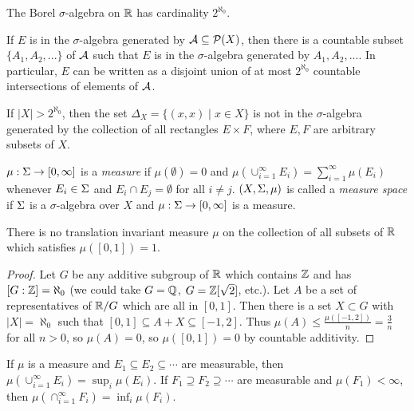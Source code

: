 \begin{cor} The Borel $\sigma$-algebra on $\mathbb{R}$ has cardinality $2^{\aleph_0}$.
\end{cor}

\begin{prop} If $E$ is in the $\sigma$-algebra generated by $\mathcal{A} \subseteq \mathcal{P}(X)$, then there is a countable subset $\{A_1, A_2, ...\}$ of $\mathcal{A}$ such that $E$ is in the $\sigma$-algebra generated by $A_1, A_2, ...$. In particular, $E$ can be written as a disjoint union of at most $2^{\aleph_0}$ countable intersections of elements of $\mathcal{A}$.
\end{prop}

\begin{cor}\label{nedoma} If $|X| > 2^{\aleph_0}$, then the set $\Delta_X = \{(x,x) \mid x \in X\}$ is not in the $\sigma$-algebra generated by the collection of all rectangles $E\times F$, where $E,F$ are arbitrary subsets of $X$.
\end{cor}

\begin{defn} $\mu:\Sigma \rightarrow [0,\infty]$ is a \emph{measure} if $\mu(\emptyset) = 0$ and $\mu(\cup_{i=1}^\infty E_i) = \sum_{i=1}^\infty \mu(E_i)$ whenever $E_i \in \Sigma$ and $E_i \cap E_j = \emptyset$ for all $i \ne j$. $(X,\Sigma, \mu)$ is called a \emph{measure space} if $\Sigma$ is a $\sigma$-algebra over $X$ and $\mu : \Sigma \rightarrow [0,\infty]$ is a measure.
\end{defn}

\begin{prop} There is no translation invariant measure $\mu$ on the collection of all subsets of $\mathbb{R}$ which satisfies $\mu([0,1]) = 1$.
\end{prop}
\begin{proof} Let $G$ be any additive subgroup of $\mathbb{R}$ which contains $\mathbb{Z}$ and has $[G:\mathbb{Z}] = \aleph_0$ (we could take $G = \mathbb{Q}$, $G = \mathbb{Z}[\sqrt{2}]$, etc.). Let $A$ be a set of representatives of $\mathbb{R}/G$ which are all in $[0,1]$. Then there is a set $X \subset G$ with $|X| = \aleph_0$ such that $[0,1] \subseteq A+X \subseteq [-1,2]$. Thus $\mu(A) \le \frac{\mu([-1,2])}{n} = \frac{3}{n}$ for all $n > 0$, so $\mu(A) = 0$, so $\mu([0,1]) = 0$ by countable additivity.
\end{proof}

\begin{prop} If $\mu$ is a measure and $E_1 \subseteq E_2 \subseteq \cdots$ are measurable, then $\mu(\cup_{i=1}^\infty E_i) = \sup_i \mu(E_i)$. If $F_1 \supseteq F_2 \supseteq \cdots$ are measurable and $\mu(F_1) < \infty$, then $\mu(\cap_{i=1}^\infty F_i) = \inf_i \mu(F_i)$.
\end{prop}

